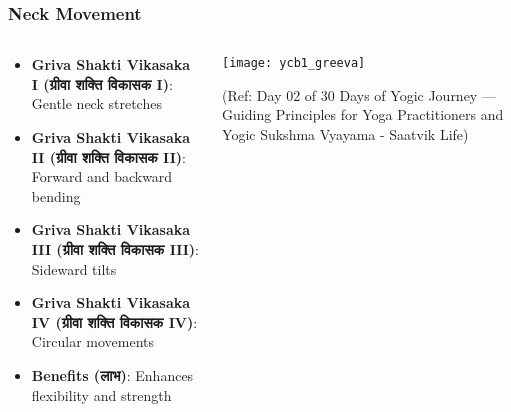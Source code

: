 \begin{frame}[fragile]\frametitle{Neck Movement}
\begin{columns}
    \begin{column}[T]{0.5\linewidth}
      \begin{itemize}
		\item \textbf{Griva Shakti Vikasaka I (ग्रीवा शक्ति विकासक I)}: Gentle neck stretches
		\item \textbf{Griva Shakti Vikasaka II (ग्रीवा शक्ति विकासक II)}: Forward and backward bending
		\item \textbf{Griva Shakti Vikasaka III (ग्रीवा शक्ति विकासक III)}: Sideward tilts
		\item \textbf{Griva Shakti Vikasaka IV (ग्रीवा शक्ति विकासक IV)}: Circular movements
		\item \textbf{Benefits (लाभ)}: Enhances flexibility and strength
	  \end{itemize}
    \end{column}
    \begin{column}[T]{0.5\linewidth}
		\begin{center}
		        \texttt{[image: ycb1\_greeva]}
				
				{\tiny (Ref: Day 02 of 30 Days of Yogic Journey — Guiding Principles for Yoga Practitioners and Yogic Sukshma Vyayama - Saatvik Life)}		
		\end{center}	
    \end{column}
\end{columns}
\end{frame}


